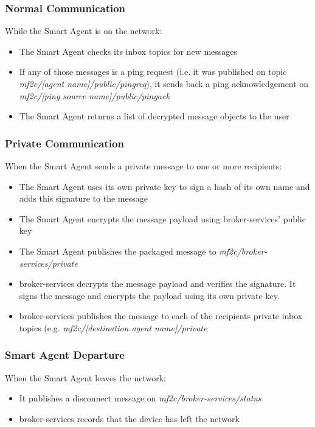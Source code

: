 \subsubsection{Normal Communication}
While the Smart Agent is on the network:
\begin{itemize}
    \item The Smart Agent checks its inbox topics for new messages
    \item If any of those messages is a ping request (i.e. it was published on topic \textit{mf2c/[agent name]/public/pingreq}), it sends back a ping acknowledgement on \textit{mf2c/[ping source name]/public/pingack}
    \item The Smart Agent returns a list of decrypted message objects to the user
\end{itemize}

\subsubsection{Private Communication}
When the Smart Agent sends a private message to one or more recipients:
\begin{itemize}
    \item The Smart Agent uses its own private key to sign a hash of its own name and adds this signature to the message
    \item The Smart Agent encrypts the message payload using broker-services' public key
    \item The Smart Agent publishes the packaged message to \textit{mf2c/broker-services/private}
    \item broker-services decrypts the message payload and verifies the signature. It signs the message and encrypts the payload using its own private key.
    \item broker-services publishes the message to each of the recipients private inbox topics (e.g. \textit{mf2c/[destination agent name]/private}
\end{itemize}

\subsubsection{Smart Agent Departure}
When the Smart Agent leaves the network:
\begin{itemize}
    \item It publishes a disconnect message on \textit{mf2c/broker-services/status}
    \item broker-services records that the device has left the network
\end{itemize}
